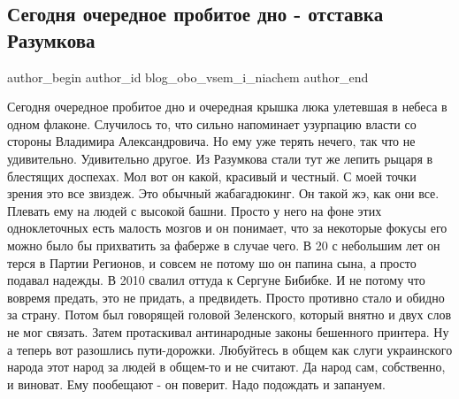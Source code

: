  
 
 
 
 
 
\subsection{Сегодня очередное пробитое дно - отставка Разумкова}
\label{sec:07_10_2021.fb.blog_obo_vsem_i_niachem.1.razumkov_otstavka}
 
\ifcmt
 author_begin
   author_id blog_obo_vsem_i_niachem
 author_end
\fi

Сегодня очередное пробитое дно и очередная крышка люка улетевшая в небеса в
одном флаконе. Случилось то, что сильно напоминает узурпацию власти со стороны
Владимира Александровича. Но ему уже терять нечего, так что не удивительно.
Удивительно другое. Из Разумкова стали тут же лепить рыцаря в блестящих
доспехах. Мол вот он какой, красивый и честный. С моей точки зрения это все
звиздеж. Это обычный жабагадюкинг. Он такой жэ, как они все. Плевать ему на
людей с высокой башни. Просто у него на фоне этих одноклеточных есть малость
мозгов и он понимает, что за некоторые фокусы его можно было бы прихватить за
фаберже в случае чего. В 20 с небольшим лет он терся в Партии Регионов, и
совсем не потому шо он папина сына, а просто подавал надежды. В 2010 свалил
оттуда к Сергуне Бибибке. И не потому что вовремя предать, это не придать, а
предвидеть. Просто противно стало и  обидно за страну. Потом был говорящей
головой Зеленского, который внятно и двух слов не мог связать. Затем
протаскивал антинародные законы бешенного принтера. Ну а теперь вот разошлись
пути-дорожки. Любуйтесь в общем как слуги украинского народа этот народ за
людей в общем-то и не считают. Да народ сам, собственно, и   виноват. Ему
пообещают - он поверит. Надо подождать и запануем.

